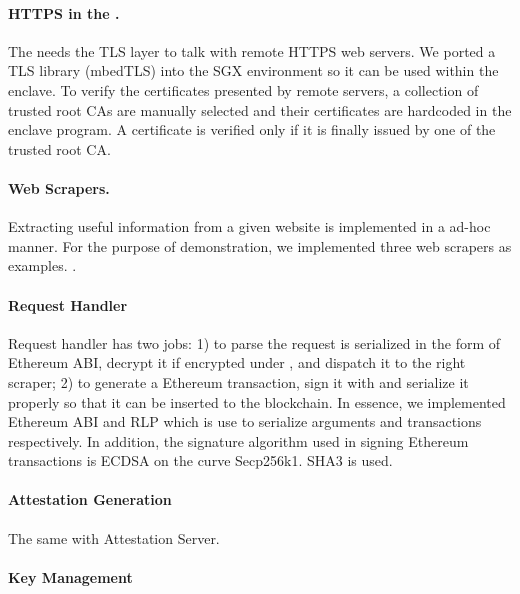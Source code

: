 \paragraph{HTTPS in the \encname.} 
The \encname needs the TLS layer to talk with remote HTTPS web servers.  We
ported a TLS library (mbedTLS) into the SGX environment so it can be used within
the enclave.  To verify the certificates presented by remote servers, a
collection of trusted root CAs are manually selected  and their
certificates are hardcoded in the enclave program. A certificate is verified
only if it is finally issued by one of the trusted root CA.

\paragraph{Web Scrapers.} Extracting useful information from a given website is
implemented in a ad-hoc manner. For the purpose of demonstration, we implemented
three web scrapers as examples. .

\paragraph{Request Handler} Request handler has two jobs: 1) to parse the
request is serialized in the form of Ethereum ABI, decrypt it if encrypted under
\pkTC, and dispatch it to the right scraper; 2) to generate a Ethereum
transaction, sign it with \pkTC and serialize it properly so that it can be
inserted to the blockchain. In essence, we implemented Ethereum ABI and RLP which
is use to serialize arguments and transactions respectively.
In addition, the signature algorithm used in signing Ethereum transactions is
ECDSA on the curve Secp256k1. SHA3 is used.

\paragraph{Attestation Generation} The same with Attestation Server.
\paragraph{Key Management} 
